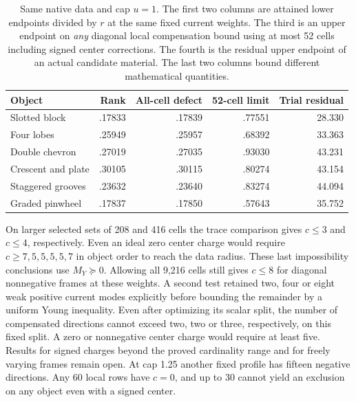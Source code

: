 \begin{table}[tbp]\centering\small
\caption{Same native data and cap $u=1$. The first two columns are attained lower endpoints divided by $r$ at the same fixed current weights. The third is an upper endpoint on \emph{any} diagonal local compensation bound using at most 52 cells including signed center corrections. The fourth is the residual upper endpoint of an actual candidate material. The last two columns bound different mathematical quantities.}
\label{tab:scope}
\begin{tabular}{@{}lrrrr@{}}\toprule
Object & Rank & All-cell defect & 52-cell limit & Trial residual\\\midrule
Slotted block & .17833 & .17839 & .77551 & 28.330\\
Four lobes & .25949 & .25957 & .68392 & 33.363\\
Double chevron & .27019 & .27035 & .93030 & 43.231\\
Crescent and plate & .30105 & .30115 & .80274 & 43.154\\
Staggered grooves & .23632 & .23640 & .83274 & 44.094\\
Graded pinwheel & .17837 & .17850 & .57643 & 35.752\\\bottomrule
\end{tabular}
\end{table}

On larger selected sets of 208 and 416 cells the trace comparison gives $c\le3$ and $c\le4$, respectively. Even an ideal zero center charge would require $c\ge7,5,5,5,5,7$ in object order to reach the data radius. These last impossibility conclusions use $M_Y\succeq0$. Allowing all 9,216 cells still gives $c\le8$ for diagonal nonnegative frames at these weights. A second test retained two, four or eight weak positive current modes explicitly before bounding the remainder by a uniform Young inequality. Even after optimizing its scalar split, the number of compensated directions cannot exceed two, two or three, respectively, on this fixed split. A zero or nonnegative center charge would require at least five. Results for signed charges beyond the proved cardinality range and for freely varying frames remain open. At cap 1.25 another fixed profile has fifteen negative directions. Any 60 local rows have $c=0$, and up to 30 cannot yield an exclusion on any object even with a signed center.

